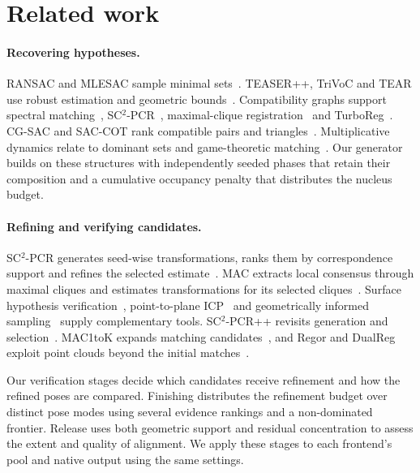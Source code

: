 \section{Related work}
\label{sec:related}
\paragraph{Recovering hypotheses.} RANSAC and MLESAC sample minimal sets~\cite{fischler1981ransac,torr2000mlesac}. TEASER++, TriVoC and TEAR use robust estimation and geometric bounds~\cite{yang2021teaser,sun2022trivoc,huang2024tear}. Compatibility graphs support spectral matching~\cite{leordeanu2005spectral}, SC$^2$-PCR~\cite{chen2022sc2}, maximal-clique registration~\cite{zhang2023mac} and TurboReg~\cite{yan2025turboreg}. CG-SAC and SAC-COT rank compatible pairs and triangles~\cite{quan2020cgsac,yang2022saccot}. Multiplicative dynamics relate to dominant sets and game-theoretic matching~\cite{pavan2007dominant,albarelli2010game}. Our generator builds on these structures with independently seeded phases that retain their composition and a cumulative occupancy penalty that distributes the nucleus budget.

\paragraph{Refining and verifying candidates.} SC$^2$-PCR generates seed-wise transformations, ranks them by correspondence support and refines the selected estimate~\cite{chen2022sc2}. MAC extracts local consensus through maximal cliques and estimates transformations for its selected cliques~\cite{zhang2023mac}. Surface hypothesis verification~\cite{aldoma2012ghv}, point-to-plane ICP~\cite{besl1992icp,chen1992medioni} and geometrically informed sampling~\cite{gelfand2003stable} supply complementary tools. SC$^2$-PCR++ revisits generation and selection~\cite{chen2023sc2pp}. MAC1toK expands matching candidates~\cite{zhang2026mac1tok}, and Regor and DualReg exploit point clouds beyond the initial matches~\cite{zhao2025regor,li2026dualreg}.

Our verification stages decide which candidates receive refinement and how the refined poses are compared. Finishing distributes the refinement budget over distinct pose modes using several evidence rankings and a non-dominated frontier. Release uses both geometric support and residual concentration to assess the extent and quality of alignment. We apply these stages to each frontend's pool and native output using the same settings.

